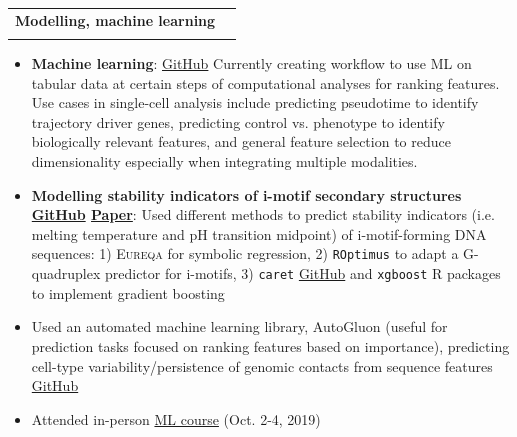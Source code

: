 \documentclass{article}
\makeatletter
\newcommand{\resumeItem}[2]{
  \item\small{
    \textbf{#1}{: #2 \vspace{-2pt}}
  }
}
\newcommand{\resumeSubheading}[4]{
  \vspace{-1pt}\item
    \begin{tabular*}{0.97\textwidth}[t]{l@{\extracolsep{\fill}}r}
      \textbf{#1} & #2 \\
      \textit{\small#3} & \textit{\small #4} \\
    \end{tabular*}\vspace{-5pt}
}
\newcommand{\resumeItemListStart}{\begin{itemize}}
\newcommand{\resumeItemListEnd}{\end{itemize}\vspace{-5pt}}
\makeatother
\begin{document}
        \resumeSubheading
        {Modelling, machine learning}{}{}{}
            \resumeItemListStart
                \resumeItem {Machine learning}{\href{https://github.com/liezeltamon/ml-tabular}{GitHub} Currently creating workflow to use ML on tabular data at certain steps of computational analyses for ranking features. Use cases in single-cell analysis include predicting pseudotime to identify trajectory driver genes, predicting control vs. phenotype to identify biologically relevant features, and general feature selection to reduce dimensionality especially when integrating multiple modalities.}
                \resumeItem{Modelling stability indicators of i-motif secondary structures \href{https://github.com/SahakyanLab/iMotif_dev}{GitHub} \href{https://doi.org/10.1002/anie.202016801}{Paper}}{Used different methods to predict stability indicators (i.e. melting temperature and pH transition midpoint) of i-motif-forming DNA sequences: 1) \textsc{Eureqa} for symbolic regression, 2) \texttt{ROptimus} to adapt a G-quadruplex predictor for i-motifs, 3) \texttt{caret} \href{https://github.com/liezeltamon/ml-lib}{GitHub} and \texttt{xgboost} R packages to implement gradient boosting}
                \item {Used an automated machine learning library, AutoGluon (useful for prediction tasks focused on ranking features based on importance), predicting cell-type variability/persistence of genomic contacts from sequence features \href{https://github.com/liezeltamon/predicting-contact-variability/tree/main}{GitHub}}
                \item {Attended in-person \href{https://training.cam.ac.uk/course/bioinfo-ml}{ML course} (Oct. 2-4, 2019)}
            \resumeItemListEnd
            
\end{document}
